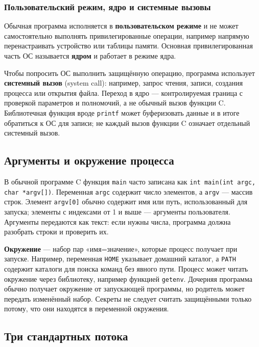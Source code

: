 \subsubsection*{Пользовательский режим, ядро и системные вызовы}

Обычная программа исполняется в \textbf{пользовательском режиме} и не может
самостоятельно выполнять привилегированные операции, например напрямую
перенастраивать устройство или таблицы памяти. Основная привилегированная часть
ОС называется \textbf{ядром} и работает в режиме ядра.

Чтобы попросить ОС выполнить защищённую операцию, программа использует
\textbf{системный вызов} (system call): например, запрос чтения, записи,
создания процесса или открытия файла. Переход в ядро --- контролируемая граница
с проверкой параметров и полномочий, а не обычный вызов функции C. Библиотечная
функция вроде \texttt{printf} может буферизовать данные и в итоге обратиться
к ОС для записи; не каждый вызов функции C означает отдельный системный вызов.

\subsection{Аргументы и окружение процесса}

В обычной программе C функция \texttt{main} часто записана как
\texttt{int main(int argc, char *argv[])}. Переменная \texttt{argc} содержит
число элементов, а \texttt{argv} --- массив строк. Элемент \texttt{argv[0]}
обычно содержит имя или путь, использованный для запуска; элементы с индексами
от 1 и выше --- аргументы пользователя. Аргументы передаются как текст: если
нужны числа, программа должна разобрать строки и проверить их.

\textbf{Окружение} --- набор пар «имя=значение», которые процесс получает при
запуске. Например, переменная \texttt{HOME} указывает домашний каталог, а
\texttt{PATH} содержит каталоги для поиска команд без явного пути. Процесс
может читать окружение через библиотеку, например функцией \texttt{getenv}.
Дочерняя программа обычно получает окружение от запускающей программы, но
родитель может передать изменённый набор. Секреты не следует считать
защищёнными только потому, что они находятся в переменной окружения.

\subsection{Три стандартных потока}

